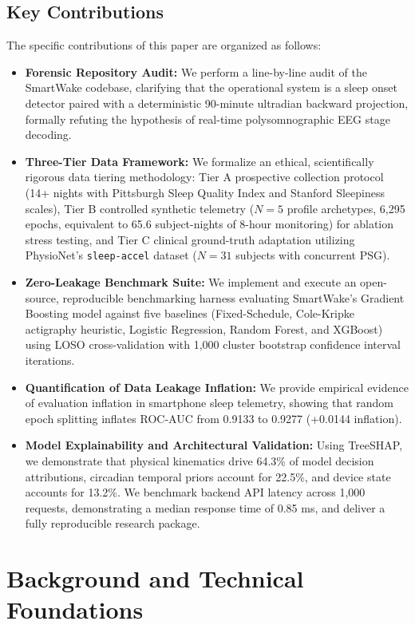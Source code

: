 \documentclass[journal,11pt,onecolumn]{IEEEtran}
\begin{document}
\subsection{Key Contributions}
The specific contributions of this paper are organized as follows:
\begin{itemize}[leftmargin=*]
    \item \textbf{Forensic Repository Audit:} We perform a line-by-line audit of the SmartWake codebase, clarifying that the operational system is a sleep onset detector paired with a deterministic 90-minute ultradian backward projection, formally refuting the hypothesis of real-time polysomnographic EEG stage decoding.
    \item \textbf{Three-Tier Data Framework:} We formalize an ethical, scientifically rigorous data tiering methodology: Tier A prospective collection protocol (14+ nights with Pittsburgh Sleep Quality Index and Stanford Sleepiness scales), Tier B controlled synthetic telemetry ($N=5$ profile archetypes, 6,295 epochs, equivalent to 65.6 subject-nights of 8-hour monitoring) for ablation stress testing, and Tier C clinical ground-truth adaptation utilizing PhysioNet's \texttt{sleep-accel} dataset ($N=31$ subjects with concurrent PSG).
    \item \textbf{Zero-Leakage Benchmark Suite:} We implement and execute an open-source, reproducible benchmarking harness evaluating SmartWake's Gradient Boosting model against five baselines (Fixed-Schedule, Cole-Kripke actigraphy heuristic, Logistic Regression, Random Forest, and XGBoost) using LOSO cross-validation with 1,000 cluster bootstrap confidence interval iterations.
    \item \textbf{Quantification of Data Leakage Inflation:} We provide empirical evidence of evaluation inflation in smartphone sleep telemetry, showing that random epoch splitting inflates ROC-AUC from 0.9133 to 0.9277 (+0.0144 inflation).
    \item \textbf{Model Explainability and Architectural Validation:} Using TreeSHAP, we demonstrate that physical kinematics drive 64.3\% of model decision attributions, circadian temporal priors account for 22.5\%, and device state accounts for 13.2\%. We benchmark backend API latency across 1,000 requests, demonstrating a median response time of 0.85 ms, and deliver a fully reproducible research package.
\end{itemize}

\section{Background and Technical Foundations}
\label{sec:background}\hypertarget{sec:background}{}
\end{document}
